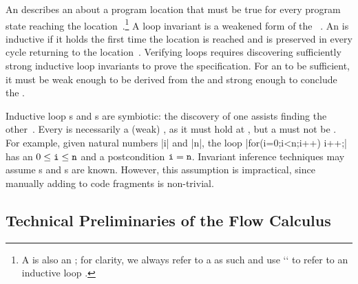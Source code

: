 An \emph{} describes an  about a program location that
must be true for every program state reaching the
location~\cite{furia2010,nguyen2022}.\footnote{A  is also an
; for clarity, we always refer to a  as such
and use `` to refer to an inductive
loop .} A {loop invariant} is a weakened form of the ~\cite{furia2010}. An
 is {inductive} if it holds the first time the location is
reached and is preserved in every cycle returning to the
location~\cite{sankaranarayanan2004}. Verifying loops requires discovering
{sufficiently strong} inductive loop invariants to prove
the specification. For an  to be sufficient, it must be weak
enough to be derived from the  and strong enough to conclude
the .

Inductive loop s
and s are symbiotic: the discovery of one assists finding the
other~\cite{furia2010}. Every  is necessarily a (weak)
, as it must hold at , but a
 must not be . For example, given natural
numbers \pr|i| and \pr|n|, the loop \prc|for(i=0;i<n;i++) i++;| has an
 \(0 \leq \prm{i} \leq \prm{n}\) and a postcondition
\(\prm{i}=\prm{n}\). Invariant inference techniques may assume
s and s are known. However, this assumption
is impractical, since manually adding  to code fragments is
non-trivial.

\subsection{Technical Preliminaries of the Flow Calculus}
\label{sec:calc}

